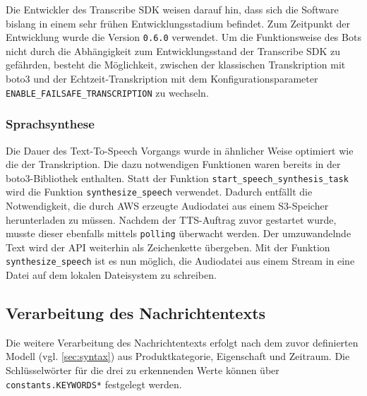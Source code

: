 Die Entwickler des Transcribe SDK weisen darauf hin, dass sich die Software bislang in einem sehr frühen Entwicklungsstadium befindet. Zum Zeitpunkt der Entwicklung wurde die Version \lstinline{0.6.0} verwendet. Um die Funktionsweise des Bots nicht durch die Abhängigkeit zum Entwicklungsstand der Transcribe SDK zu gefährden, besteht die Möglichkeit, zwischen der klassischen Transkription mit boto3 und der Echtzeit-Transkription mit dem Konfigurationsparameter \lstinline{ENABLE_FAILSAFE_TRANSCRIPTION} zu wechseln.

\subsubsection{Sprachsynthese}

Die Dauer des Text-To-Speech Vorgangs wurde in ähnlicher Weise optimiert wie die der Transkription. Die dazu notwendigen Funktionen waren bereits in der boto3-Bibliothek enthalten. Statt der Funktion \lstinline{start_speech_synthesis_task} wird die Funktion \lstinline{synthesize_speech} verwendet. Dadurch entfällt die Notwendigkeit, die durch AWS erzeugte Audiodatei aus einem S3-Speicher herunterladen zu müssen. Nachdem der TTS-Auftrag zuvor gestartet wurde, musste dieser ebenfalls mittels \lstinline{polling} überwacht werden. Der umzuwandelnde Text wird der API weiterhin als Zeichenkette übergeben. Mit der Funktion \lstinline{synthesize_speech} ist es nun möglich, die Audiodatei aus einem Stream in eine Datei auf dem lokalen Dateisystem zu schreiben. 

\subsection{Verarbeitung des Nachrichtentexts}

Die weitere Verarbeitung des Nachrichtentexts erfolgt nach dem zuvor definierten Modell (vgl. \autoref{sec:syntax}) aus Produktkategorie, Eigenschaft und Zeitraum. Die Schlüsselwörter für die drei zu erkennenden Werte können über \lstinline{constants.KEYWORDS*} festgelegt werden.
